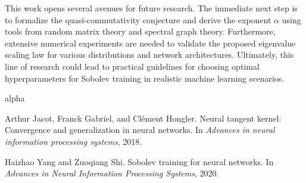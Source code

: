 \documentclass{article}
\begin{document}
This work opens several avenues for future research. The immediate next step is to formalize the quasi-commutativity conjecture and derive the exponent $\alpha$ using tools from random matrix theory and spectral graph theory. Furthermore, extensive numerical experiments are needed to validate the proposed eigenvalue scaling law for various distributions and network architectures. Ultimately, this line of research could lead to practical guidelines for choosing optimal hyperparameters for Sobolev training in realistic machine learning scenarios.


\begin{thebibliography}{alpha}

Arthur Jacot, Franck Gabriel, and Cl{\'e}ment Hongler.
\newblock Neural tangent kernel: Convergence and generalization in neural networks.
\newblock In {\em Advances in neural information processing systems}, 2018.

Haizhao Yang and Zuoqiang Shi.
\newblock Sobolev training for neural networks.
\newblock In {\em Advances in Neural Information Processing Systems}, 2020.

\end{thebibliography}
\end{document}
